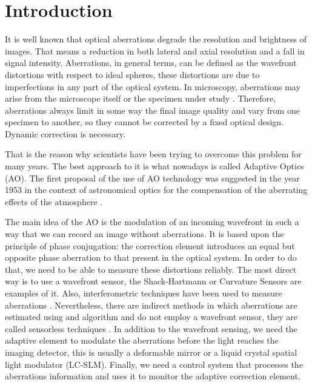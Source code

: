 \section{Introduction}
\label{sec:Introduction}

It is well known that optical aberrations degrade the resolution and brightness of images. That means a reduction in both lateral and axial resolution and a fall in signal intensity. Aberrations, in general terms, can be defined as the wavefront distortions with respect to ideal spheres, these distortions are due to imperfections in any part of the optical system. In microscopy, aberrations may arise from the microscope itself or the specimen under study \cite{AOM_basic_ref}. Therefore, aberrations always limit in some way the final image quality and vary from one specimen to another, so they cannot be corrected by a fixed optical design. Dynamic correction is necessary. 
 
That is the reason why scientists have been trying to overcome this problem for many years. The best approach to it is what nowadays is called Adaptive Optics (AO).
The first proposal of the use of AO technology was suggested in the year 1953 in the context of astronomical optics for the compensation of the aberrating effects of the atmosphere \cite{Babcock1953}.

The main idea of the AO is the modulation of an incoming wavefront in such a way that we can record an image without aberrations. It is based upon the principle of phase conjugation: the correction element introduces an equal but opposite phase aberration to that present in the optical system. In order to do that, we need to be able to measure these distortions reliably. The most direct way is to use a wavefront sensor, the Shack-Hartmann \cite{Principles_HS, History_HS} or Curvature Sensors \cite{Curvature_Sensor_1st_Paper} are examples of it. Also, interferometric techniques have been used to measure aberrations \cite{Interferometric_methods}. Nevertheless, there are indirect methods in which aberrations are estimated using and algorithm and do not employ a wavefront sensor, they are called sensorless techniques \cite{WF_sensorless}. 
In addition to the wavefront sensing, we need the adaptive element to modulate the aberrations before the light reaches the imaging detector, this is usually a deformable mirror or a liquid crystal spatial light modulator (LC-SLM). Finally, we need a control system that processes the aberrations information and uses it to monitor the adaptive correction element.

